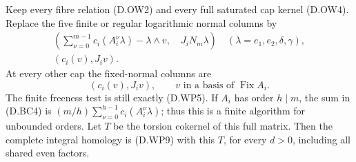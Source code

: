 Keep every fibre relation (D.OW2) and every full
saturated cap kernel (D.OW4). Replace the five
finite or regular logarithmic normal columns by
\[
 \begin{gathered}
 \left(\sum_{\nu=0}^{m-1}c_i(A_i^\nu\lambda)
                  -\lambda\wedge v,\quad J_iN_m\lambda\right)
       \quad(\lambda=e_1,e_2,\delta,\gamma),\\
                       (c_i(v),J_iv).
 \end{gathered}                                          \tag{D.BC4}
\]
At every other cap the fixed-normal columns are
\[
                         (c_i(v),J_iv),
                         \qquad v\text{ in a basis of }\operatorname{Fix} A_i.
                                                        \tag{D.BC5}
\]
The finite freeness test is still exactly (D.WP5).
If $A_i$ has order $h\mid m$, the sum in (D.BC4)
is $(m/h)\sum_{\nu=0}^{h-1}c_i(A_i^\nu\lambda)$;
thus this is a finite algorithm for unbounded orders.
Let $T$ be the torsion cokernel of this full matrix.
Then the complete integral homology is (D.WP9)
with this $T$, for every $d>0$, including all
shared even factors.


